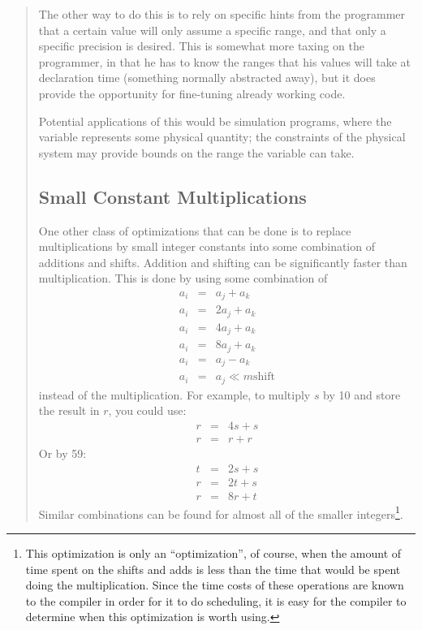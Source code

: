 \begin{quote}
The other way to do this is to rely on specific hints from the programmer
that a certain value will only assume a specific range, and that only a
specific precision is desired.  This is somewhat more taxing on the
programmer, in that he has to know the ranges that his values will take at
declaration time (something normally abstracted away), but it does provide
the opportunity for fine-tuning already working code.

Potential applications of this would be simulation programs, where the
variable represents some physical quantity; the constraints of the physical
system may provide bounds on the range the variable can take.
\subsection{Small Constant Multiplications}

One other class of optimizations that can be done is to replace
multiplications by small integer constants into some combination of
additions and shifts.  Addition and shifting can be significantly faster
than multiplication.  This is done by using some combination of
\begin{eqnarray*}
a_i & = & a_j + a_k \\
a_i & = & 2a_j + a_k \\
a_i & = & 4a_j + a_k \\
a_i & = & 8a_j + a_k \\
a_i & = & a_j - a_k \\
a_i & = & a_j \ll m \mbox{shift}
\end{eqnarray*}
instead of the multiplication.  For example, to multiply $s$ by 10 and store
the result in $r$, you could use:
\begin{eqnarray*}
r & = & 4s + s\\
r & = & r + r
\end{eqnarray*}
Or by 59:
\begin{eqnarray*}
t & = & 2s + s \\
r & = & 2t + s \\
r & = & 8r + t
\end{eqnarray*}
Similar combinations can be found for almost all of the smaller
integers\footnote{This optimization is only an ``optimization'', of course,
when the amount of time spent on the shifts and adds is less than the time
that would be spent doing the multiplication.  Since the time costs of these
operations are known to the compiler in order for it to do scheduling, it is
easy for the compiler to determine when this optimization is worth using.}.
\cite{magenheimer:precision}


\end{quote}
